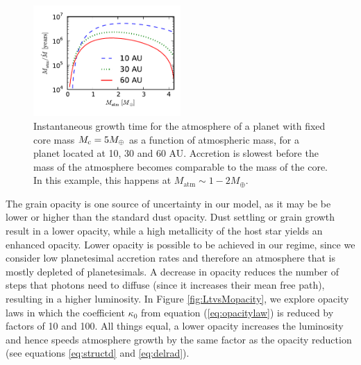 \documentclass[apj]{emulateapj}
\begin{document}
\begin{figure}[h]
\centering
\includegraphics[width=0.5\textwidth]{../../figs/ModelAtmospheres/RadSelfGravPoly/PaperFigs/Mt_profile.pdf}
\caption{Instantaneous growth time for the atmosphere of a planet with fixed core mass $M_{\rm c}=5 M_{\oplus}$ as a function of atmospheric mass, for a planet located at 10, 30 and 60 AU. Accretion is slowest before the mass of the atmosphere becomes comparable to the mass of the core. In this example, this happens at $M_{\mathrm{atm}} \sim 1-2 M_{\oplus}$.}
\label{fig:growthtime}
\end{figure}

The grain opacity is one source of uncertainty in our model, as it may be be lower or higher than the standard dust opacity. Dust settling or grain growth result in a lower opacity, while a high metallicity of the host star yields an enhanced opacity. Lower opacity is possible to be achieved in our regime, since we consider low planetesimal accretion rates and therefore an atmosphere that is mostly depleted of planetesimals.  A decrease in opacity reduces the number of steps that photons need to diffuse (since it increases their mean free path), resulting in a higher luminosity. In Figure \ref{fig:LtvsMopacity}, we explore opacity laws in which the coefficient $\kappa_0$ from equation (\ref{eq:opacitylaw}) is reduced by factors of 10 and 100. All things equal, a lower opacity increases the luminosity and hence speeds atmosphere growth by the same factor as the opacity reduction (see equations \ref{eq:structd} and \ref{eq:delrad}). 
 
\end{document}
